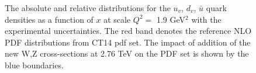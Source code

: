 \begin{figure}[!tbp]
\begin{minipage}[h]{0.43\linewidth}
\end{minipage}
\hfill
\begin{minipage}[h]{0.43\linewidth}
\end{minipage}
\vfill
\begin{minipage}[h]{0.43\linewidth}
\end{minipage}
\hfill
\begin{minipage}[h]{0.43\linewidth}
\end{minipage}
\vfill
\begin{minipage}[h]{0.43\linewidth}
\end{minipage}
\hfill
\begin{minipage}[h]{0.43\linewidth}
\end{minipage}
\caption{The absolute and  relative distributions for the $u_v$, $d_v$, $\bar{u}$ quark densities as a function of $x$ at scale $Q^2=$ 1.9 GeV$^2$ with the experimental uncertainties. The red band denotes the reference NLO PDF distributions from CT14 pdf set. The impact of addition of the new W,Z cross-sections at 2.76 TeV on the PDF set is shown by the blue boundaries.}
\label{fig:PDFValenceShift}
\end{figure}

